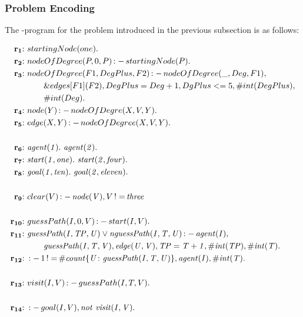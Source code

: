 \documentclass[a4paper, titlepage]{article}
\newcommand{\ext}[3]{\ensuremath{\&{#1}[#2](#3)}}
\DeclareMathOperator{\leftimpl}{:-}
\DeclareMathOperator{\nott}{\mathit{not}}
\DeclareMathOperator{\noteq}{!=}
\newcommand{\rowprefix}[1]{%
  \ensuremath{\color{black}\mathbf{#1{:}}\ }%
}
\begin{document}
\subsubsection{Problem Encoding}
The \hex-program for the problem introduced in the previous 
subsection is as follows:
\begin{exmp}
\label{pathfindingAgent}
\begin{align*}
\rowprefix{r_1} & startingNode(one). \\
\rowprefix{r_2} & nodeOfDegree(P,0,P) \leftimpl startingNode(P). 
\\
\rowprefix{r_3} & nodeOfDegree(F1, DegPlus, F2) \leftimpl 
nodeOfDegree(\_, Deg, F1), \\ & \qquad \ext{edges}{F1}{F2}, 
DegPlus=Deg+1, DgPlus <= 5, \#int(DegPlus), \\ & \qquad \#int(Deg). 
\\
\rowprefix{r_4} & node(Y) \leftimpl nodeOfDegre(X, V, Y).  \\
\rowprefix{r_5} & edge(X,Y) \leftimpl nodeOfDegree(X,V,Y).\\
\\
\rowprefix{r_6} &  \mathit{agent(1). } \ \mathit{ agent(2). }\\
\rowprefix{r_7} & \mathit{start(1,one).} \ \mathit{ 
start(2,four).} \\
\rowprefix{r_8} & \mathit{goal(1,ten).} \ \mathit{ 
goal(2,eleven).} \\
\\
\rowprefix{r_9} & clear(V) \leftimpl \mathit{node(V)}, V \noteq 
\mathit{three}\\ 
\\
\rowprefix{r_{10}} & guessPath(I,0,V) \leftimpl start(I,V). \\
\rowprefix{r_{11}} &  \mathit{guessPath(I, TP, U)} \vee 
\mathit{nguessPath(I, T, U)} \leftimpl 
\mathit{agent(I)}, \\ & \qquad  \mathit{guessPath(I, T, V)},  
\mathit{edge(U,V)}, \mathit{TP=T+1}, 
\mathit{\#int(TP)}, \mathit{\#int(T).}  \\
\rowprefix{r_{12}} &  \leftimpl 1 \noteq \mathit{\#count\{ U 
\colon guessPath(I, T, U) \}}, \mathit{agent(I)}, 
\mathit{\#int(T)}.  \\
\\
\rowprefix{r_{13}}&  visit(I, V) \leftimpl guessPath(I,T,V). \\
\\
\rowprefix{r_{14}} & \leftimpl goal(I, V), \nott \thinspace  
\mathit{visit(I, V).} \\

\end{align*}
\end{exmp}
\end{document}
